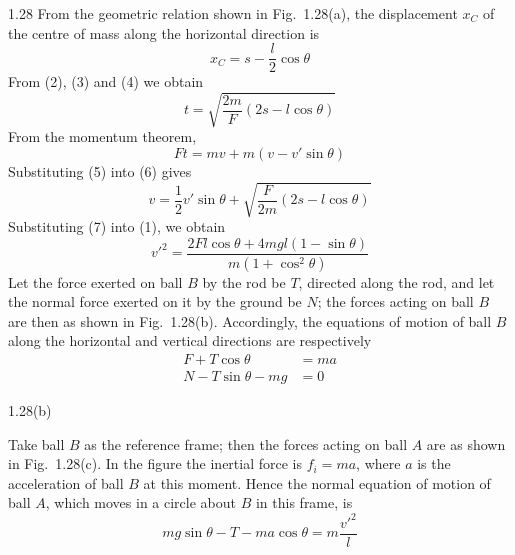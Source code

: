 \begin{solution}{1.28}
From the geometric relation shown in Fig.~1.28(a), the displacement $x_C$ of the centre of mass along the horizontal direction is
\begin{equation}
x_C=s-\frac{l}{2}\cos\theta \tag{4}
\end{equation}
From (2), (3) and (4) we obtain
\begin{equation}
t=\sqrt{\frac{2m}{F}(2s-l\cos\theta)} \tag{5}
\end{equation}
From the momentum theorem,
\begin{equation}
Ft=mv+m(v-v'\sin\theta) \tag{6}
\end{equation}
Substituting (5) into (6) gives
\begin{equation}
v=\frac{1}{2}v'\sin\theta+\sqrt{\frac{F}{2m}(2s-l\cos\theta)} \tag{7}
\end{equation}
Substituting (7) into (1), we obtain
\begin{equation}
v'^2=\frac{2Fl\cos\theta+4mgl(1-\sin\theta)}{m(1+\cos^2\theta)} \tag{8}
\end{equation}
Let the force exerted on ball $B$ by the rod be $T$, directed along the rod, and let the normal force exerted on it by the ground be $N$; the forces acting on ball $B$ are then as shown in Fig.~1.28(b). Accordingly, the equations of motion of ball $B$ along the horizontal and vertical directions are respectively
\begin{align}
F+T\cos\theta&=ma \tag{9}\\
N-T\sin\theta-mg&=0 \tag{10}
\end{align}

\begin{figbox}{1.28(b)}
\end{figbox}
Take ball $B$ as the reference frame; then the forces acting on ball $A$ are as shown in Fig.~1.28(c). In the figure the inertial force is $f_i=ma$, where $a$ is the acceleration of ball $B$ at this moment. Hence the normal equation of motion of ball $A$, which moves in a circle about $B$ in this frame, is
\begin{equation}
mg\sin\theta-T-ma\cos\theta=m\frac{v'^2}{l} \tag{11}
\end{equation}


\end{solution}
